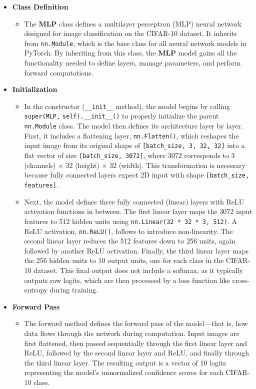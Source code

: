 \documentclass[a4paper,12pt]{article}
\begin{document}
\begin{itemize}
    \item \textbf{Class Definition}
    \begin{itemize}
        \item The \textbf{MLP} class defines a multilayer perceptron (MLP) neural network designed for image classification on the CIFAR-10 dataset. It inherits from \verb|nn.Module|, which is the base class for all neural network models in PyTorch. By inheriting from this class, the \textbf{MLP} model gains all the functionality needed to define layers, manage parameters, and perform forward computations.
    \end{itemize}

    \item \textbf{Initialization}
    \begin{itemize}
        \item In the constructor (\verb|__init__| method), the model begins by calling \verb|super(MLP,| \verb|self).__init__()| to properly initialize the parent \verb|nn.Module| class. The model then defines its architecture layer by layer. First, it includes a flattening layer, \verb|nn.Flatten()|, which reshapes the input image from its original shape of \verb|[batch_size, 3, 32, 32]| into a flat vector of size \verb|[batch_size, 3072]|, where 3072 corresponds to 3 (channels) × 32 (height) × 32 (width). This transformation is necessary because fully connected layers expect 2D input with shape \verb|[batch_size, features]|.

        \item Next, the model defines three fully connected (linear) layers with ReLU activation functions in between. The first linear layer maps the 3072 input features to 512 hidden units using \verb|nn.Linear(32 * 32 * 3, 512)|. A ReLU activation, \verb|nn.ReLU()|, follows to introduce non-linearity. The second linear layer reduces the 512 features down to 256 units, again followed by another ReLU activation. Finally, the third linear layer maps the 256 hidden units to 10 output units, one for each class in the CIFAR-10 dataset. This final output does not include a softmax, as it typically outputs raw logits, which are then processed by a loss function like cross-entropy during training.
    \end{itemize}

    \item \textbf{Forward Pass}
    \begin{itemize}
        \item The forward method defines the forward pass of the model—that is, how data flows through the network during computation. Input images are first flattened, then passed sequentially through the first linear layer and ReLU, followed by the second linear layer and ReLU, and finally through the third linear layer. The resulting output is a vector of 10 logits representing the model's unnormalized confidence scores for each CIFAR-10 class.
    \end{itemize}


\end{itemize}
\end{document}
